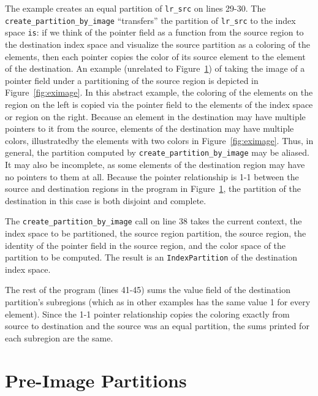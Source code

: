 The example creates an equal partition of {\tt lr\_src} on lines 29-30.  The {\tt create\_partition\_by\_image} ``transfers'' the partition of {\tt lr\_src} to the index space {\tt is}: if we think of the pointer field as a function from the source region to the destination index space and visualize the source partition as a coloring of the elements, then each pointer copies the color of its source element to the element of the destination.  An
example (unrelated to Figure~\ref{fig:image}) of taking the image of a pointer field under a partitioning of the source region is depicted in Figure~\ref{fig:eximage}.  In this abstract example, the coloring of the elements on the region on the left is copied via the pointer field to the elements of the index space or region on the right.  Because an element in the destination may have multiple pointers to it from the source, elements of the destination may have multiple colors, illustratedby the elements with two colors in Figure~\ref{fig:eximage}.  Thus, in general, the partition computed by {\tt create\_partition\_by\_image} may be aliased.  It may also be incomplete, as some elements of the destination region may have no pointers to them at all.  Because the pointer relationship is 1-1 between the source and destination regions
in the program in Figure~\ref{fig:image}, the partition of the destination in this case is both disjoint and complete.

The {\tt create\_partition\_by\_image} call on line 38 takes the current context, the index space to be partitioned, the source region partition, the source region, the identity of the pointer field in the source region, and the color space of the partition to be computed.  The result is an {\tt IndexPartition} of the destination index space.

The rest of the program (lines 41-45) sums the value field of the destination partition's subregions (which as in other examples has the same value 1 for every element).  Since the 1-1 pointer relationship copies the coloring exactly from source to destination and the source was an equal partition, the sums printed for each subregion are the same.

\begin{figure}
  
  \caption{}
  \label{fig:image}
\end{figure}

\section{Pre-Image Partitions}
\label{sec:preimage}


